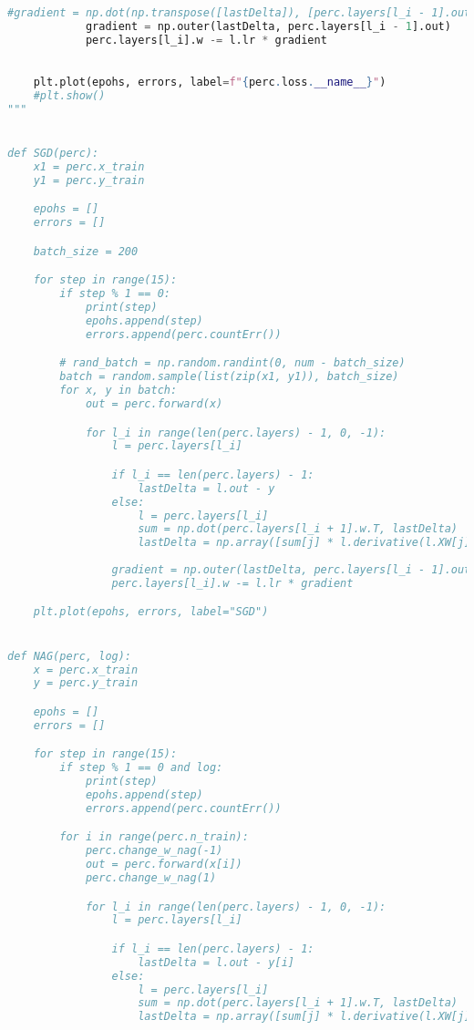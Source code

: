 \documentclass[a4paper, 14pt]{extarticle}
\begin{document}
\begin{lstlisting}[language=Python,caption={methods.py},label={lst:code2}]
            #gradient = np.dot(np.transpose([lastDelta]), [perc.layers[l_i - 1].out])
            gradient = np.outer(lastDelta, perc.layers[l_i - 1].out)
            perc.layers[l_i].w -= l.lr * gradient
                

    plt.plot(epohs, errors, label=f"{perc.loss.__name__}")
    #plt.show()
"""


def SGD(perc):
    x1 = perc.x_train
    y1 = perc.y_train

    epohs = []
    errors = []

    batch_size = 200

    for step in range(15):
        if step % 1 == 0:
            print(step)
            epohs.append(step)
            errors.append(perc.countErr())

        # rand_batch = np.random.randint(0, num - batch_size)
        batch = random.sample(list(zip(x1, y1)), batch_size)
        for x, y in batch:
            out = perc.forward(x)

            for l_i in range(len(perc.layers) - 1, 0, -1):
                l = perc.layers[l_i]

                if l_i == len(perc.layers) - 1:
                    lastDelta = l.out - y
                else:
                    l = perc.layers[l_i]
                    sum = np.dot(perc.layers[l_i + 1].w.T, lastDelta)
                    lastDelta = np.array([sum[j] * l.derivative(l.XW[j]) for j in range(l.n_neurons)])
                    
                gradient = np.outer(lastDelta, perc.layers[l_i - 1].out)
                perc.layers[l_i].w -= l.lr * gradient

    plt.plot(epohs, errors, label="SGD")


def NAG(perc, log):
    x = perc.x_train
    y = perc.y_train

    epohs = []
    errors = []

    for step in range(15):
        if step % 1 == 0 and log:
            print(step)
            epohs.append(step)
            errors.append(perc.countErr())

        for i in range(perc.n_train):
            perc.change_w_nag(-1)
            out = perc.forward(x[i])
            perc.change_w_nag(1)

            for l_i in range(len(perc.layers) - 1, 0, -1):
                l = perc.layers[l_i]

                if l_i == len(perc.layers) - 1:
                    lastDelta = l.out - y[i]
                else:
                    l = perc.layers[l_i]
                    sum = np.dot(perc.layers[l_i + 1].w.T, lastDelta)
                    lastDelta = np.array([sum[j] * l.derivative(l.XW[j]) for j in range(l.n_neurons)])
                    

\end{lstlisting}
\end{document}
